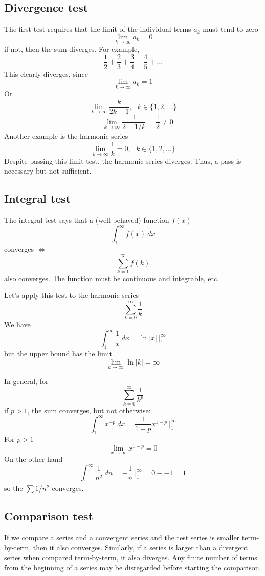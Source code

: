 \documentclass[11pt, oneside]{article}
\begin{document}
\subsection*{Divergence test}
The first test requires that the limit of the individual terms $a_k$ must tend to zero
\[ \lim_{k \rightarrow \infty} a_k = 0 \]
if not, then the sum diverges.  For example,
\[ \frac{1}{2} + \frac{2}{3} + \frac{3}{4} + \frac{4}{5} + \dots \]
This clearly diverges, since
\[ \lim_{k \rightarrow \infty} a_k = 1 \]
Or
\[ \lim_{k \rightarrow \infty} \frac{k}{2k + 1}, \ \ \ k \in \{1,2,\dots\} \]
\[ = \lim_{k \rightarrow \infty} \frac{1}{2 + 1/k} = \frac{1}{2} \ne 0 \]
Another example is the harmonic series
\[ \lim_{k \rightarrow \infty} \frac{1}{k} = 0, \ \ \ k \in \{1,2,\dots\} \]
Despite passing this limit test, the harmonic series diverges.  Thus, a pass is necessary but not sufficient.

\subsection*{Integral test}
The integral test says that a (well-behaved) function $f(x)$
\[ \int_1^{\infty} f(x) \ dx \]
converges $\iff$
\[ \sum_{k=1}^{\infty} f(k) \]
also converges.  The function must be continuous and integrable, etc.

Let's apply this test to the harmonic series
\[ \sum_{k=0}^{\infty} \frac{1}{k} \]
We have
\[ \int_1^{\infty} \frac{1}{x} \ dx = \ln |x| \ \bigg |_1^{\infty} \]
but the upper bound has the limit
\[ \lim_{k \rightarrow \infty} \ln |k| = \infty \]

In general, for
\[ \sum_{k=0}^{\infty} \frac{1}{k^p} \]
if $p>1$, the sum converges, but not otherwise:
\[ \int_1^{\infty} x^{-p} \ dx = \frac{1}{1-p}x^{1-p} \ \bigg |_1^{\infty} \]
For $p>1$
\[ \lim_{x \rightarrow \infty} x^{1-p} = 0 \]
On the other hand
\[ \int_1^{\infty} \frac{1}{n^2} \ dn = - \frac{1}{n} \ \bigg |_1^{\infty} = 0 - - 1 = 1 \]
so the $\sum 1/n^2$ converges.

\subsection*{Comparison test}
If we compare a series and a convergent series and the test series is smaller term-by-term, then it also converges.  Similarly, if a series is larger than a divergent series when compared term-by-term, it also diverges.  Any finite number of terms from the beginning of a series may be disregarded before starting the comparison.
\end{document}
